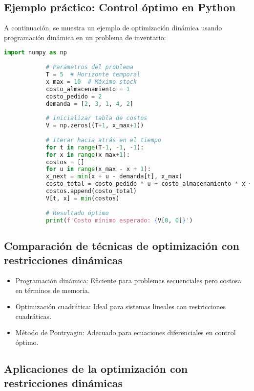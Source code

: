 \begin{itemize}
		\subsection{Ejemplo práctico: Control óptimo en Python}
		
		A continuación, se muestra un ejemplo de optimización dinámica usando programación dinámica en un problema de inventario:
		
		\begin{lstlisting}[language=Python, caption={Programación dinámica para optimización de inventarios}]
			import numpy as np
			
			# Parámetros del problema
			T = 5  # Horizonte temporal
			x_max = 10  # Máximo stock
			costo_almacenamiento = 1
			costo_pedido = 2
			demanda = [2, 3, 1, 4, 2]
			
			# Inicializar tabla de costos
			V = np.zeros((T+1, x_max+1))
			
			# Iterar hacia atrás en el tiempo
			for t in range(T-1, -1, -1):
			for x in range(x_max+1):
			costos = []
			for u in range(x_max - x + 1):
			x_next = min(x + u - demanda[t], x_max)
			costo_total = costo_pedido * u + costo_almacenamiento * x + V[t+1, x_next]
			costos.append(costo_total)
			V[t, x] = min(costos)
			
			# Resultado óptimo
			print(f'Costo mínimo esperado: {V[0, 0]}')
		\end{lstlisting}
		
		\subsection{Comparación de técnicas de optimización con restricciones dinámicas}
		
		\begin{itemize}
			\item Programación dinámica: Eficiente para problemas secuenciales pero costosa en términos de memoria.
			\item Optimización cuadrática: Ideal para sistemas lineales con restricciones cuadráticas.
			\item Método de Pontryagin: Adecuado para ecuaciones diferenciales en control óptimo.
		\end{itemize}
		
		\subsection{Aplicaciones de la optimización con restricciones dinámicas}
		

\end{itemize}
